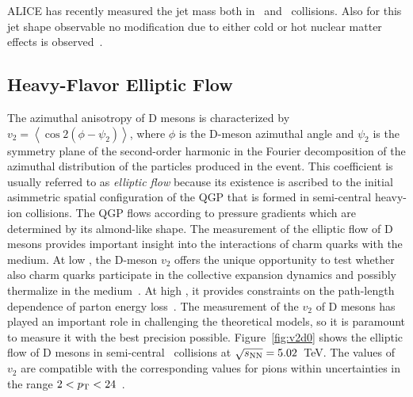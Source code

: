 \documentclass[10pt]{article}
\begin{document}
ALICE has recently measured the jet mass both in \pPb\ and \PbPb\ collisions. Also for this jet shape observable no modification due to either cold or hot nuclear matter effects is observed~\cite{}.

\subsection{Heavy-Flavor Elliptic Flow}
The azimuthal anisotropy of D mesons is characterized by $v_2= \left<\cos 2(\phi - \psi_2)\right>$, where $\phi$ is the D-meson azimuthal angle and $\psi_2$ is the symmetry plane of the second-order
harmonic in the Fourier decomposition of the azimuthal distribution of the particles produced in the event.
This coefficient is usually referred to as \emph{elliptic flow} because its existence is ascribed to the initial asimmetric spatial configuration of the QGP that is formed in semi-central heavy-ion collisions.
The QGP flows according to pressure gradients which are determined by its almond-like shape.
The measurement of the elliptic flow of D mesons provides important insight into the interactions of charm quarks with the
medium. At low \pt, the D-meson $v_2$ offers the unique opportunity to test whether also charm quarks participate in
the collective expansion dynamics and possibly thermalize in the medium~\cite{}. At high \pt, it provides constraints on the path-length dependence of parton energy loss~\cite{}.
The measurement of the $v_2$ of D mesons has played an important role in challenging
the theoretical models, so it is paramount to measure it with the best precision possible.
Figure~\ref{fig:v2d0} shows the elliptic flow of D mesons in semi-central \PbPb\ collisions at $\sqrt{s_{\rm NN}}=5.02$~TeV.
The values of $v_2$ are compatible with the corresponding values for pions within uncertainties in the range $2<p_{\rm T}<24$~\GeVc.
\end{document}
